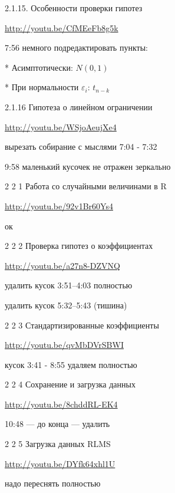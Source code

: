 \documentclass[12pt,a4paper]{article}
\begin{document}
2.1.15. Особенности проверки гипотез

\url{http://youtu.be/CfMEeFb8g5k}

7:56 немного подредактировать пункты:

* Асимптотически: $N(0,1)$

* При нормальности $\varepsilon_i$: $t_{n-k}$

2.1.16 Гипотеза о линейном ограничении 

\url{http://youtu.be/WSjoAeujXe4}

вырезать собирание с мыслями 7:04 - 7:32

9:58 маленький кусочек не отражен зеркально
 

2 2 1 Работа со случайными величинами в R 

\url{http://youtu.be/92v1Br60Ys4}

ок

2 2 2 Проверка гипотез о коэффициентах

\url{http://youtu.be/a27n8-DZVNQ}

удалить кусок 3:51--4:03 полностью 

удалить кусок 5:32--5:43 (тишина)


2 2 3 Стандартизированные коэффициенты

\url{http://youtu.be/qvMbDVrSBWI}

кусок 3:41 - 8:55 удаляем полностью
 
2 2 4  Сохранение и загрузка данных 

\url{http://youtu.be/8chddRL-EK4}

10:48 --- до конца --- удалить

2 2 5 Загрузка данных RLMS

\url{http://youtu.be/DYfk64xhl1U}

надо переснять полностью
\end{document}
